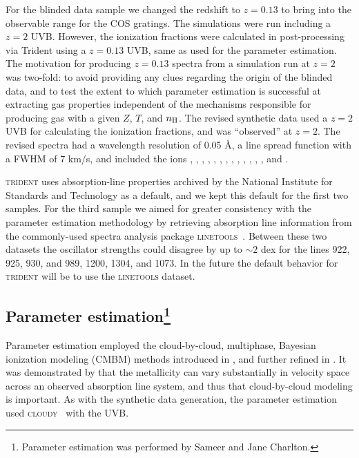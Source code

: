 \documentclass[fleqn,usenatbib]{mnras}
\begin{document}
For the blinded data sample we changed the redshift to $z=0.13$ to bring  into the observable range for the COS gratings.
The simulations were run including a $z=2$ UVB.
However, the ionization fractions were calculated in post-processing via Trident using a $z=0.13$ \cite{haardt2012RADIATIVE} UVB, same as used for the parameter estimation.
The motivation for producing $z=0.13$ spectra from a simulation run at $z=2$ was two-fold:
to avoid providing any clues regarding the origin of the blinded data,
and to test the extent to which parameter estimation is successful at extracting gas properties independent of the mechanisms responsible for producing gas with a given $Z$, $T$, and $n_{\rm H}$.
The revised synthetic data used a $z=2$ UVB for calculating the ionization fractions, and was ``observed'' at $z=2$.
The revised spectra had a wavelength resolution of 0.05 \AA,
a line spread function with a FWHM of 7 km/s,
and included the ions , , , , , , , , , , , , , and .

\textsc{trident} uses absorption-line properties archived by the National Institute for Standards and Technology as a default, and we kept this default for the first two samples.
For the third sample we aimed for greater consistency with the parameter estimation methodology by retrieving absorption line information from the commonly-used spectra analysis package \textsc{linetools}~\citep{prochaska2016Linetools}.
Between these two datasets the oscillator strengths could disagree by up to $\sim 2$ dex for the lines  922, 925, 930, and 989,  1200,  1304, and  1073.
In the future the default behavior for \textsc{trident} will be to use the \textsc{linetools} dataset.

\subsection[Parameter estimation]{Parameter estimation\footnote{
 Parameter estimation was performed by Sameer and Jane Charlton.}}
\label{s:  parameter estimation}

 Parameter estimation employed the cloud-by-cloud, multiphase, Bayesian ionization modeling (CMBM) methods introduced in \cite{sameer2021Cloudbycloud}, and further refined in \cite{sameer2022Probing}.
 It was demonstrated by \cite{Prochter2010,lehner2019COS,Wotta2019,Zahedy2021,lehner2022Intermediate} that the metallicity can vary substantially in velocity space across an observed absorption line system, and thus that cloud-by-cloud modeling is important.
 As with the synthetic data generation, the  parameter estimation used \textsc{cloudy}~\citep{ferland20132013} with the \cite{haardt2012RADIATIVE} UVB.
\end{document}
